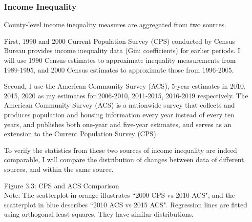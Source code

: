 \documentclass{article}
\begin{document}
\subsubsection{Income Inequality}
County-level income inequality measures are aggregated from two sources. 

First, 1990 and 2000 Current Population Survey (CPS) conducted by Census Bureau provides income inequality data (Gini coefficients) for earlier periods. I will use 1990 Census estimates to approximate inequality measurements from 1989-1995, and 2000 Census estimates to approximate those from 1996-2005. 

Second, I use the American Community Survey (ACS), 5-year estimates in 2010, 2015, 2020 as my estimates for 2006-2010, 2011-2015, 2016-2019 respectively. The American Community Survey (ACS) is a nationwide survey that collects and produces population and housing information every year instead of every ten years, and publishes both one-year and five-year estimates, and serves as an extension to the Current Population Survey (CPS). 

To verify the statistics from these two sources of income inequality are indeed comparable, I will compare the distribution of changes between data of different sources, and within the same source. 
\begin{center}
Figure 3.3: CPS and ACS Comparison\\
\noindent
{}
\noindent Note: The scatterplot in orange illustrates ``2000 CPS vs 2010 ACS", and the scatterplot in blue describes ``2010 ACS vs 2015 ACS". Regression lines are fitted using orthogonal least squares. They have similar distributions. 
\end{center}
\end{document}
